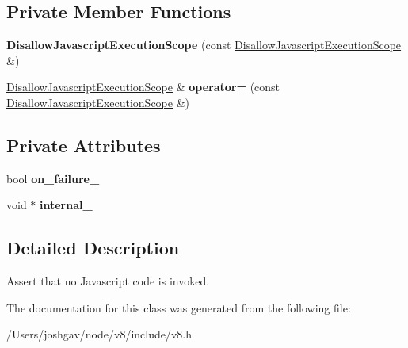 \subsection*{Private Member Functions}
\begin{DoxyCompactItemize}
\item 
{\bfseries Disallow\+Javascript\+Execution\+Scope} (const \hyperlink{classv8_1_1_isolate_1_1_disallow_javascript_execution_scope}{Disallow\+Javascript\+Execution\+Scope} \&)\hypertarget{classv8_1_1_isolate_1_1_disallow_javascript_execution_scope_a08a0a0dfb4804078bb86bf266aa36f05}{}\label{classv8_1_1_isolate_1_1_disallow_javascript_execution_scope_a08a0a0dfb4804078bb86bf266aa36f05}

\item 
\hyperlink{classv8_1_1_isolate_1_1_disallow_javascript_execution_scope}{Disallow\+Javascript\+Execution\+Scope} \& {\bfseries operator=} (const \hyperlink{classv8_1_1_isolate_1_1_disallow_javascript_execution_scope}{Disallow\+Javascript\+Execution\+Scope} \&)\hypertarget{classv8_1_1_isolate_1_1_disallow_javascript_execution_scope_aa8f45d19c0dc9467a0df64e4081ce75c}{}\label{classv8_1_1_isolate_1_1_disallow_javascript_execution_scope_aa8f45d19c0dc9467a0df64e4081ce75c}

\end{DoxyCompactItemize}
\subsection*{Private Attributes}
\begin{DoxyCompactItemize}
\item 
bool {\bfseries on\+\_\+failure\+\_\+}\hypertarget{classv8_1_1_isolate_1_1_disallow_javascript_execution_scope_a2b3fe3cb1347fadbb6233e3ba4802ed9}{}\label{classv8_1_1_isolate_1_1_disallow_javascript_execution_scope_a2b3fe3cb1347fadbb6233e3ba4802ed9}

\item 
void $\ast$ {\bfseries internal\+\_\+}\hypertarget{classv8_1_1_isolate_1_1_disallow_javascript_execution_scope_ac86111f7dadf1eb5d5ac2c49b3faa06a}{}\label{classv8_1_1_isolate_1_1_disallow_javascript_execution_scope_ac86111f7dadf1eb5d5ac2c49b3faa06a}

\end{DoxyCompactItemize}


\subsection{Detailed Description}
Assert that no Javascript code is invoked. 

The documentation for this class was generated from the following file\+:\begin{DoxyCompactItemize}
\item 
/\+Users/joshgav/node/v8/include/v8.\+h\end{DoxyCompactItemize}

